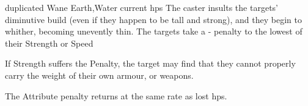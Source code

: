   {duplicated}%
  {Wane}%
  {Earth,Water}%
  {current \glspl{hp}}%
  {The caster insults the targets' diminutive build (even if they happen to be tall and strong), and they begin to whither, becoming unevently thin.
    The targets take a - penalty to the lowest of their Strength or Speed}%
  {If Strength suffers the Penalty, the target may find that they cannot properly carry the weight of their own armour, or weapons.

    The Attribute penalty returns at the same rate as lost \glspl{hp}.}

